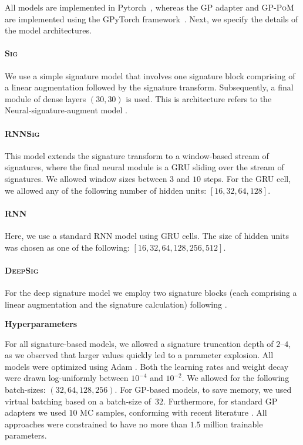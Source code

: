 \documentclass{article}
\renewcommand{\subsubsection}[1]{\textbf{#1}

} %
\begin{document}
All models are implemented in Pytorch~\citep{pytorch2019}, whereas the
GP adapter and \textsc{GP-PoM} are implemented using the GPyTorch
framework~\citep{gardner2018gpytorch}. Next, we specify the details of
the model architectures.

\paragraph{\textsc{Sig}}
We use a simple signature model that involves one        signature block comprising of a linear
    augmentation followed by the signature transform. Subsequently, a final module of dense layers $(30,30)$ is used. This is architecture refers to the Neural-signature-augment model \cite{kidger2019deep}.
  \paragraph{\textsc{RNNSig}} This model extends the signature transform to a window-based
    stream of signatures, where the final neural module is a GRU
    sliding over the stream of signatures. We allowed window sizes between $3$ and $10$ steps. For the GRU cell, we allowed any of the following number of hidden units: $[16,32,64,128]$.
    
  \paragraph{\textsc{RNN}} Here, we use a standard RNN model using GRU cells. The size of hidden units was chosen as one of the following: $[16,32,64,128, 256, 512]$.
  \paragraph{\textsc{DeepSig}} For the deep signature model we  employ two signature blocks (each comprising a linear augmentation and the signature calculation) following \citet{kidger2019deep}.

\subsubsection{Hyperparameters}

For all signature-based models, we allowed a signature truncation
depth of $2$--$4$, as we observed that larger values quickly led to
a parameter explosion. All models were optimized using Adam
\citep{kingma2014adam}. Both the learning rates and weight decay
were drawn log-uniformly between $10^{-4}$ and $10^{-2}$. We allowed
for the following batch-sizes: $(32, 64, 128, 256)$. For GP-based
models, to save memory, we used virtual batching based on
a batch-size of~$32$. Furthermore, for standard GP adapters we used $10$ MC samples, conforming with recent literature \citep{futoma2017mgp, moor2019early}. All approaches were constrained to have no more than $1.5$ million trainable parameters.
    
\end{document}
